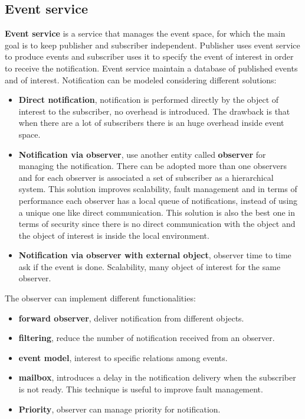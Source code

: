 \documentclass[11pt,a4paper]{article}
\begin{document}
\subsection{Event service}
\textbf{Event service} is a service that manages the event space, for which the main goal is to keep publisher and subscriber independent. Publisher uses event service to produce events and subscriber uses it to specify the event of interest in order to receive the notification.
Event service maintain a database of published events and of interest.
Notification can be modeled considering different solutions:
\begin{itemize}
	\item \textbf{Direct notification}, notification is performed directly by the object of interest to the subscriber, no overhead is introduced. The drawback is that when there are a lot of  subscribers there is an huge overhead inside event space. 
	\item \textbf{Notification via observer}, use another entity called \textbf{observer} for managing the notification. There can be adopted more than one observers and for each observer is associated a set of subscriber as a hierarchical system. This solution improves scalability, fault management and in terms of performance each observer has a local queue of notifications, instead of using a unique one like direct communication. This solution is also the best one in terms of security since there is no direct communication with the object and the object of interest is inside the local environment.
	\item \textbf{Notification via observer with external object}, observer time to time ask if the event is done. Scalability, many object of interest for the same observer.
\end{itemize}
The observer can implement different functionalities:
\begin{itemize}
	\item \textbf{forward observer}, deliver notification from different objects.
	\item \textbf{filtering}, reduce the number of notification received from an observer.
	\item \textbf{event model}, interest to specific relations among events.
	\item \textbf{mailbox}, introduces a delay in the notification delivery when the subscriber is not ready. This technique is useful to improve fault management.
	\item \textbf{Priority}, observer can manage priority for notification.
\end{itemize}
\end{document}
